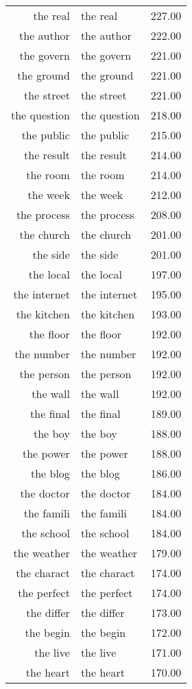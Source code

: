 \begin{table}[ht]
\begin{tabular}{rlr}
  the real & the real & 227.00 \\ 
  the author & the author & 222.00 \\ 
  the govern & the govern & 221.00 \\ 
  the ground & the ground & 221.00 \\ 
  the street & the street & 221.00 \\ 
  the question & the question & 218.00 \\ 
  the public & the public & 215.00 \\ 
  the result & the result & 214.00 \\ 
  the room & the room & 214.00 \\ 
  the week & the week & 212.00 \\ 
  the process & the process & 208.00 \\ 
  the church & the church & 201.00 \\ 
  the side & the side & 201.00 \\ 
  the local & the local & 197.00 \\ 
  the internet & the internet & 195.00 \\ 
  the kitchen & the kitchen & 193.00 \\ 
  the floor & the floor & 192.00 \\ 
  the number & the number & 192.00 \\ 
  the person & the person & 192.00 \\ 
  the wall & the wall & 192.00 \\ 
  the final & the final & 189.00 \\ 
  the boy & the boy & 188.00 \\ 
  the power & the power & 188.00 \\ 
  the blog & the blog & 186.00 \\ 
  the doctor & the doctor & 184.00 \\ 
  the famili & the famili & 184.00 \\ 
  the school & the school & 184.00 \\ 
  the weather & the weather & 179.00 \\ 
  the charact & the charact & 174.00 \\ 
  the perfect & the perfect & 174.00 \\ 
  the differ & the differ & 173.00 \\ 
  the begin & the begin & 172.00 \\ 
  the live & the live & 171.00 \\ 
  the heart & the heart & 170.00 \\ 

\end{tabular}
\end{table}
